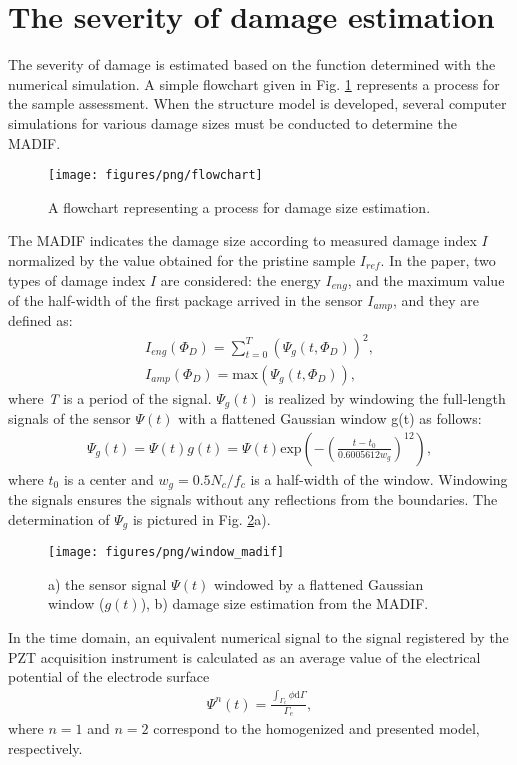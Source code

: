\documentclass[sensors,article,submit,moreauthors,pdftex]{Definitions/mdpi}
\begin{document}
\section{The severity of damage estimation}
\label{sec:severity}
The severity of damage is estimated based on the function determined with the numerical simulation.
A simple flowchart given in Fig. \ref{fig:Flowchart} represents a process for the sample assessment.
When the structure model is developed, several computer simulations for various damage sizes must be conducted to determine the MADIF.
\begin{figure}
	\begin{center}
		\texttt{[image: figures/png/flowchart]}
	\end{center}
	\caption{A flowchart representing a process for damage size estimation.}
	\label{fig:Flowchart}
\end{figure}
The MADIF indicates the damage size according to measured damage index \(I\) normalized by the value obtained for the pristine sample \(I_{ref}\).
In the paper, two types of damage index \(I\) are considered: the energy \(I_{eng}\), and the maximum value of the half-width of the first package arrived in the sensor \(I_{amp}\), and they are defined as:
\begin{eqnarray}
	I_{eng}(\Phi_D)=\sum_{t=0}^{T} \left (\Psi_g(t,\Phi_D)\right )^2,\\
	I_{amp}(\Phi_D)=\mathrm{max}\left ( \Psi_g(t,\Phi_D)\right ),
\label{eq:I_amp}
\end{eqnarray}
where \textit{T} is a period of the signal.
\(\Psi_g(t)\) is realized by windowing the full-length signals of the sensor \(\Psi(t)\) with a flattened Gaussian window g(t) as follows:
\begin{eqnarray}
	\Psi_g(t)=\Psi(t)g(t)= \Psi(t)\mathrm{exp}\left(-\left(\frac{t-t_0}{0.6005612w_g}\right) ^{12}\right),
	\label{eq:psi_g}
\end{eqnarray}
where \(t_0\) is a center and \(w_g=0.5N_c/f_c\) is a half-width of the window.
Windowing the signals ensures the signals without any reflections from the boundaries.
The determination of \(\Psi_g\) is pictured in Fig. \ref{fig:window_madif}a).
\begin{figure}
	\begin{center}
		\texttt{[image: figures/png/window\_madif]}
	\end{center}
	\caption{a) the sensor signal \(\Psi(t)\) windowed by a flattened Gaussian window (\(g(t)\)), b) damage size estimation from the MADIF.}
	\label{fig:window_madif}
\end{figure}
In the time domain, an equivalent numerical signal to the signal registered by the PZT acquisition instrument is calculated as an average value of the electrical potential of the electrode surface
\begin{eqnarray}
	\Psi^{n}(t) = \frac{\int_{\Gamma_e}\phi\mathrm{d}\Gamma}{\Gamma_e},
	\label{eq:psi}
\end{eqnarray}
where \(n=1\) and \(n=2\) correspond to the homogenized and presented model, respectively.
\end{document}
